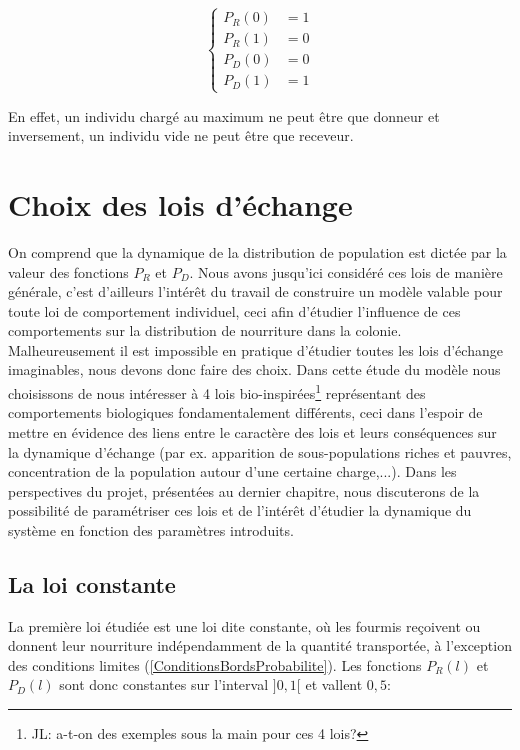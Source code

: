 \begin{equation}
\left \{
\begin{aligned}
P_R(0)&=1 \\
P_R(1)&=0 \\
P_D(0)&=0 \\
P_D(1)&=1
\end{aligned}
\right.
\label{ConditionsBordsProbabilite}
\end{equation}

En effet, un individu chargé au maximum ne peut être que donneur et inversement, un individu vide ne peut être que receveur.






\section{Choix des lois d'échange}

On comprend que la dynamique de la distribution de population est dictée par la valeur des fonctions $P_R$ et $P_D$. Nous avons jusqu'ici considéré ces lois de manière générale, c'est d'ailleurs l'intérêt du travail de construire un modèle valable pour toute loi de comportement individuel, ceci afin d'étudier l'influence de ces comportements sur la distribution de nourriture dans la colonie.\\

Malheureusement il est impossible en pratique d'étudier toutes les lois d'échange imaginables, nous devons donc faire des choix. Dans cette étude du modèle nous choisissons de nous intéresser à 4 lois bio-inspirées\footnote{JL: a-t-on des exemples sous la main pour ces 4 lois?} représentant des comportements biologiques fondamentalement différents, ceci dans l'espoir de mettre en évidence des liens entre le caractère des lois et leurs conséquences sur la dynamique d'échange (par ex. apparition de sous-populations riches et pauvres, concentration de la population autour d'une certaine charge,...). Dans les perspectives du projet, présentées au dernier chapitre, nous discuterons de la possibilité de paramétriser ces lois et de l'intérêt d'étudier la dynamique du système en fonction des paramètres introduits.\\


\subsection{La loi constante}

La première loi étudiée est une loi dite constante, où les fourmis reçoivent ou donnent leur nourriture indépendamment de la quantité transportée, à l'exception des conditions limites (\ref{ConditionsBordsProbabilite}). Les fonctions $P_R(l)$ et $P_D(l)$ sont donc constantes sur l'interval $]0,1[$ et vallent $0,5$:\\


